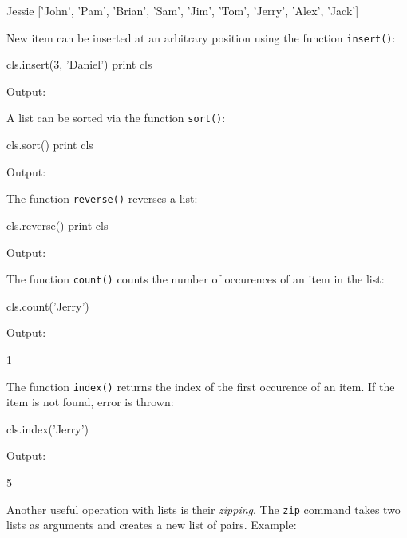 \begin{greencode}
Jessie
['John', 'Pam', 'Brian', 'Sam', 'Jim', 
'Tom', 'Jerry', 'Alex', 'Jack']
\end{greencode}
New item can be inserted at an arbitrary position using the function {\tt insert()}:

\begin{bluecode}
cls.insert(3, 'Daniel')
print cls
\end{bluecode}
Output:

\begin{greencode}
\end{greencode}
A list can be sorted via the function {\tt sort()}:

\begin{bluecode}
cls.sort()
print cls
\end{bluecode}
Output:

\begin{greencode}
\end{greencode}
The function {\tt reverse()} reverses a list:

\begin{bluecode}
cls.reverse()
print cls
\end{bluecode}
Output:

\begin{greencode}
\end{greencode}
The function {\tt count()} counts the number of occurences of an item
in the list:

\begin{bluecode}
cls.count('Jerry')
\end{bluecode}
Output:

\begin{greencode}
1
\end{greencode}
The function {\tt index()} returns the index of the first occurence 
of an item. If the item is not found, error is thrown:

\begin{bluecode}
cls.index('Jerry')
\end{bluecode}
Output:

\begin{greencode}
5
\end{greencode}
Another useful operation with lists is their {\em zipping}. The {\tt zip} command takes two lists as arguments 
and creates a new list of pairs. Example:

